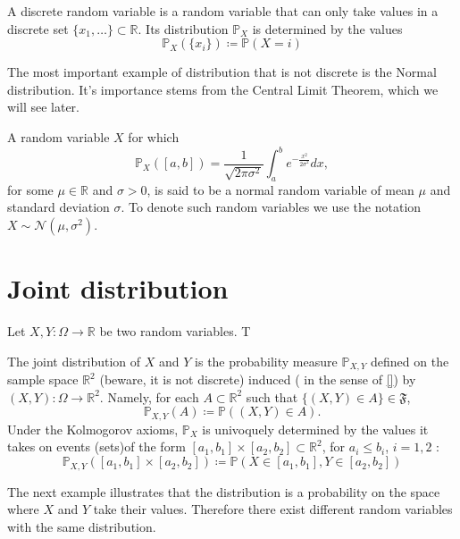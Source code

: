 	\begin{example}
	A discrete random variable is a random variable that can only take values in a discrete set $\{x_1,\ldots\} \subset \mathbb R$. Its distribution $\mathbb P_X$ is determined by the values 
		\begin{equation}
			\label{e:discrete_distr}
			\mathbb P_X(\{x_i\}) \coloneq \mathbb P(X = i)
		\end{equation}
	\end{example}

	The most important example of distribution that is not discrete is the Normal distribution. It's importance stems from the Central Limit Theorem, which we will see later. 
	\begin{example}
		A random variable $X$ for which 
		\begin{equation}
			\mathbb P_X ([a,b]) = \frac{1}{\sqrt{2\pi\sigma^2}}\int_a^b e^{-\frac{x^2}{2\sigma^2}}  dx, 
		\end{equation}
		for some $\mu \in \mathbb R $ and $\sigma >0$, is said to be a normal random variable of mean $\mu$ and standard deviation $\sigma$. To denote such random variables we use the notation $X \sim \mathcal N (\mu, \sigma^2)$. 
	\end{example}
	
	\section{Joint distribution}
	Let $X, Y: \Omega \to \mathbb R$ be two random variables. T
	

	\begin{definition} The joint distribution of $X$ and $Y$  is the probability measure $\mathbb P_{X,Y}$ defined on the sample space $\mathbb R^2$ (beware, it is not discrete) induced ( in the sense of \eqref{}) by $(X, Y): \Omega \to \mathbb R^2$. Namely, for each $A \subset \mathbb R^2$ such that $\{ (X,Y) \in A\} \in \mathfrak F$,
	\begin{equation}	
		\label{e:distrjoint}
		\mathbb P_{X,Y}(A) \coloneqq \mathbb P((X,Y) \in A).
	\end{equation}   
	Under the Kolmogorov axioms, $\mathbb P_X$ is univoquely determined by the values it takes on events (sets)of the form $[a_1,b_1]\times [a_2,b_2] \subset \mathbb R^2 $, for $a_i \leq b_i$, $i = 1,2$ : 
	\begin{equation}
		\label{e:distr_interval}
		\mathbb P_{X,Y}([a_1,b_1]\times [a_2,b_2]) \coloneq \mathbb P(X \in [a_1,b_1], Y \in [a_2,b_2])
	\end{equation}	
	
	\end{definition}
	The next example illustrates that the distribution is a probability on the space where $X$ and $Y$ take their values. Therefore there exist different random variables with the same distribution. 

